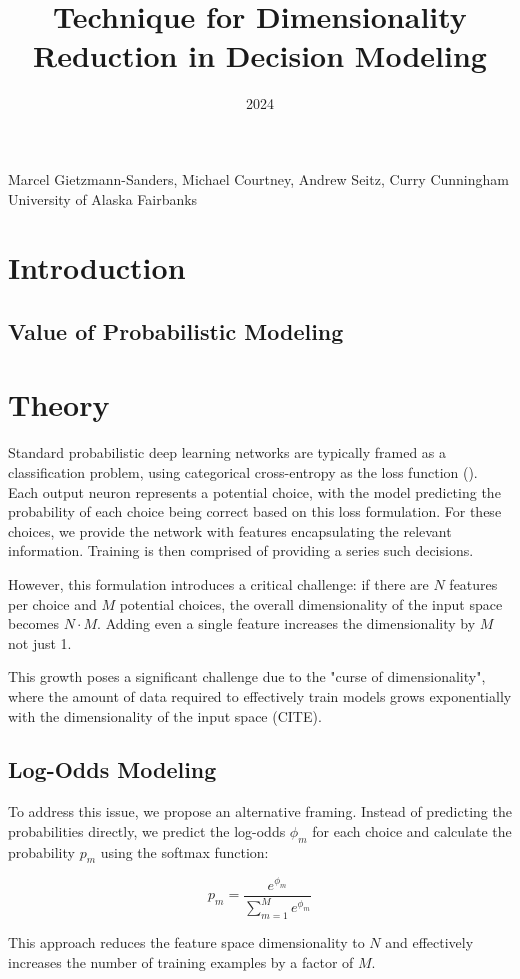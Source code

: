 \documentclass[11pt]{article}
\title{Technique for Dimensionality Reduction in Decision Modeling}
\date{2024}
\makeatletter
\renewcommand{\maketitle}{
\begin{center}

\pagestyle{empty}

{\LARGE \bf \@title\par}
\vspace{1cm}

{\Large Marcel Gietzmann-Sanders, Michael Courtney, Andrew Seitz, Curry Cunningham}\\[1cm]

University of Alaska Fairbanks


\end{center}
}\makeatother
\makeatother
\begin{document}
\maketitle

\section*{Introduction}

\subsection*{Value of Probabilistic Modeling}

\section*{Theory}

Standard probabilistic deep learning networks are typically framed as a classification problem, using categorical cross-entropy as the loss function (\cite{durr}). Each output neuron represents a potential choice, with the model predicting the probability of each choice being correct based on this loss formulation. For these choices, we provide the network with features encapsulating the relevant information. Training is then comprised of providing a series such decisions. 

However, this formulation introduces a critical challenge: if there are $N$ features per choice and $M$ potential choices, the overall dimensionality of the input space becomes $N \cdot M$. Adding even a single feature increases the dimensionality by $M$ not just 1.

This growth poses a significant challenge due to the "curse of dimensionality", where the amount of data required to effectively train models grows exponentially with the dimensionality of the input space (CITE).

\subsection*{Log-Odds Modeling}

To address this issue, we propose an alternative framing. Instead of predicting the probabilities directly, we predict the log-odds $\phi_m$ for each choice and calculate the probability $p_m$ using the softmax function:

$$p_m = \frac{e^{\phi_m}}{\sum_{m=1}^{M}e^{\phi_m}}$$

This approach reduces the feature space dimensionality to $N$ and effectively increases the number of training examples by a factor of $M$.
\end{document}
